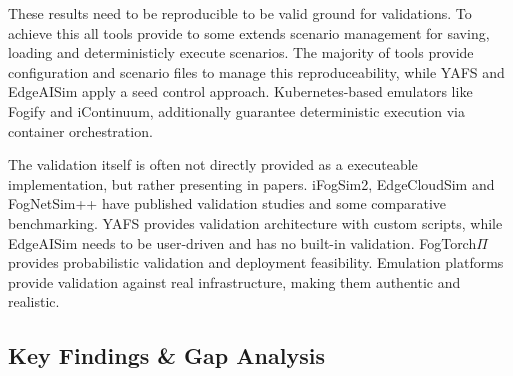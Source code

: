 These results need to be reproducible to be valid ground for validations.
To achieve this all tools provide to some extends scenario management for saving, loading and deterministicly execute scenarios.
The majority of tools provide configuration and scenario files to manage this reproduceability, while YAFS and EdgeAISim apply a seed control approach.
Kubernetes-based emulators like Fogify and iContinuum, additionally guarantee deterministic execution via container orchestration. 

The validation itself is often not directly provided as a executeable implementation, but rather presenting in papers.
iFogSim2, EdgeCloudSim and FogNetSim++ have published validation studies and some comparative benchmarking.
YAFS provides validation architecture with custom scripts, while EdgeAISim needs to be user-driven and has no built-in validation.
FogTorch$\Pi$ provides probabilistic validation and deployment feasibility.
Emulation platforms provide validation against real infrastructure, making them authentic and realistic.

\subsection{Key Findings \& Gap Analysis}

